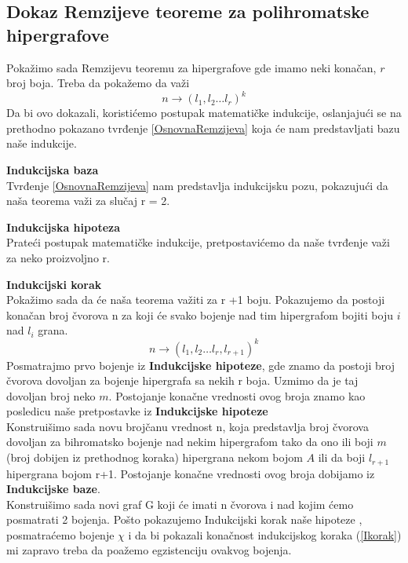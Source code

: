 \documentclass[a4paper]{article}
\begin{document}
	\subsection{Dokaz Remzijeve teoreme za polihromatske hipergrafove}
	Pokažimo sada Remzijevu teoremu za hipergrafove gde imamo neki konačan, $r$ broj boja. Treba da pokažemo da važi 
	\begin{equation}
		n \rightarrow (l_1, l_2 \dots l_r)^k
	\end{equation}
	Da bi ovo dokazali, koristićemo postupak matematičke indukcije, oslanjajući se na prethodno pokazano tvrđenje \ref{OsnovnaRemzijeva} koja će nam predstavljati bazu naše indukcije.
	\begin{description}
		\item \textbf{Indukcijska baza} \\
		Tvrđenje \ref{OsnovnaRemzijeva} nam predstavlja indukcijsku pozu, pokazujući da naša teorema važi za slučaj r = 2.\\
		\item \textbf{Indukcijska hipoteza}\\
		Prateći postupak matematičke indukcije, pretpostavićemo da naše tvrđenje važi za neko proizvoljno r.
		\item \textbf{Indukcijski korak}\\
		Pokažimo sada da će naša teorema važiti za r +1 boju.
		Pokazujemo da postoji konačan broj čvorova n za koji će svako bojenje nad tim hipergrafom bojiti boju $i$ nad $l_i$ grana. %
		\begin{equation}\label{Ikorak}
		 n \rightarrow (l_1, l_2 \dots l_r, l_{r+1})^k
		\end{equation}
		Posmatrajmo prvo bojenje iz \textbf{Indukcijske hipoteze}, gde znamo da postoji broj čvorova dovoljan za bojenje hipergrafa sa nekih r boja. Uzmimo da je taj dovoljan broj neko $m$. Postojanje konačne vrednosti ovog broja znamo kao posledicu naše pretpostavke iz \textbf{Indukcijske hipoteze}\\
		Konstruišimo sada novu brojčanu vrednost n, koja predstavlja broj čvorova dovoljan za bihromatsko bojenje nad nekim hipergrafom tako da ono ili boji $m$ (broj dobijen iz prethodnog koraka) hipergrana nekom bojom $A$ ili da boji $l_{r+1}$ hipergrana bojom r+1. Postojanje konačne vrednosti ovog broja dobijamo iz \textbf{Indukcijske baze}. 
		\\
		Konstruišimo sada novi graf G koji će imati n čvorova i nad kojim ćemo posmatrati 2 bojenja. Pošto pokazujemo Indukcijski korak naše hipoteze , posmatraćemo bojenje $\chi$ i da bi pokazali konačnost indukcijskog koraka (\ref{Ikorak}) mi zapravo treba da poažemo egzistenciju ovakvog bojenja.

\end{description}
\end{document}
